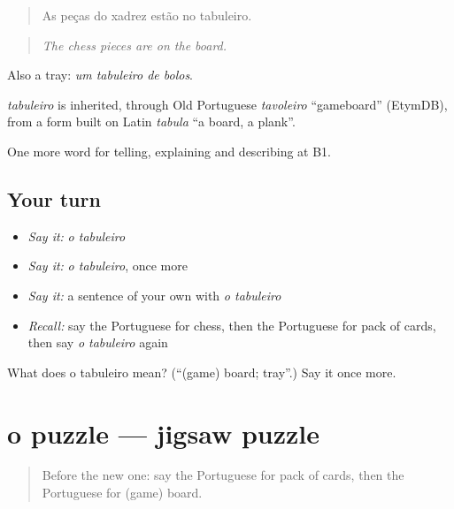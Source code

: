 \begin{quote}
As peças do xadrez estão no tabuleiro.
\end{quote}

\begin{quote}
\emph{The chess pieces are on the board.}
\end{quote}

Also a tray: \emph{um tabuleiro de bolos}.

\begin{cousinweb}
\emph{tabuleiro} is inherited, through Old Portuguese \emph{tavoleiro} \textquotedblleft{}gameboard\textquotedblright{} (EtymDB), from a form built on Latin \emph{tabula} \textquotedblleft{}a board, a plank\textquotedblright{}.
\end{cousinweb}

\begin{grammarlens}[title={What you've built}]
One more word for telling, explaining and describing at B1.
\end{grammarlens}

\subsection*{Your turn}
\begin{itemize}
\raggedright
  \item \emph{Say it:} \emph{o tabuleiro}
  \item \emph{Say it:} \emph{o tabuleiro}, once more
  \item \emph{Say it:} a sentence of your own with \emph{o tabuleiro}
  \item \emph{Recall:} say the Portuguese for chess, then the Portuguese for pack of cards, then say \emph{o tabuleiro} again
\end{itemize}

\begin{tcolorbox}[breakable,colback=teal!4,colframe=teal!35!black,title={Before you move on}]
What does o tabuleiro mean? (\textquotedblleft{}(game) board; tray\textquotedblright{}.) Say it once more.
\end{tcolorbox}
\section[o puzzle]{o puzzle — jigsaw puzzle}

\label{lesson:PT-C503-puzzle}



\begin{quote}
Before the new one: say the Portuguese for pack of cards, then the Portuguese for (game) board.
\end{quote}

